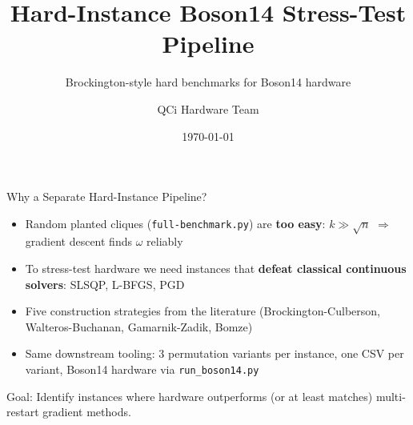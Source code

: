 \documentclass[aspectratio=169]{beamer}
\title{Hard-Instance Boson14 Stress-Test Pipeline}
\subtitle{Brockington-style hard benchmarks for Boson14 hardware}
\author{QCi Hardware Team}
\date{\today}
\institute{Quantum Computing Inc.}
\begin{document}

\maketitle


\begin{frame}{Why a Separate Hard-Instance Pipeline?}
    \begin{itemize}
        \item Random planted cliques (\texttt{full-benchmark.py}) are \textbf{too easy}: $k \gg \sqrt{n}$ $\Rightarrow$ gradient descent finds $\omega$ reliably
        \item To stress-test hardware we need instances that \textbf{defeat classical continuous solvers}: SLSQP, L-BFGS, PGD
        \item Five construction strategies from the literature (Brockington-Culberson, Walteros-Buchanan, Gamarnik-Zadik, Bomze)
        \item Same downstream tooling: 3 permutation variants per instance, one CSV per variant, Boson14 hardware via \texttt{run\_boson14.py}
    \end{itemize}

    \vspace{1em}
    \alert{Goal:} Identify instances where hardware outperforms (or at least matches) multi-restart gradient methods.
\end{frame}

\end{document}
